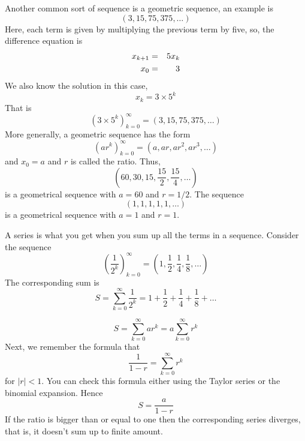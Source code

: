 \documentclass{scrreprt}
\theoremstyle{plain}
\theoremstyle{definition}
\theoremstyle{remark}
\begin{document}
Another common sort of sequence is a geometric sequence, an example is 
\begin{equation}
(3,15,75,375,\ldots)
\end{equation}
Here, each term is given by multiplying the previous term by five, so,
the difference equation is
\begin{eqnarray}
x_{k+1}&=&5x_k\cr
x_0&=&3
\end{eqnarray}
We also know the solution in this case,
\begin{equation}
x_k=3\times 5^k
\end{equation}
That is 
\begin{equation}
(3\times 5^k)_{k=0}^\infty=(3,15,75,375,\ldots)
\end{equation}
More generally, a geometric sequence has the form
\begin{equation}
(ar^k)_{k=0}^\infty=(a,ar,ar^2,ar^3,\ldots)
\end{equation}
and $x_0=a$ and $r$ is called the ratio. Thus,
\begin{equation}
\left(60,30,15,\frac{15}{2},\frac{15}{4},\ldots\right)
\end{equation}
is a geometrical sequence with $a=60$ and $r=1/2$. The sequence
\begin{equation}
\left(1,1,1,1,1,\ldots\right)
\end{equation}
is a geometrical sequence with $a=1$ and $r=1$.

A series is what you get when you sum up all the terms in a
sequence. Consider the sequence 
\begin{equation}
\left(\frac{1}{2^k}\right)_{k=0}^\infty=\left(1,\frac{1}{2},\frac{1}{4},\frac{1}{8},\ldots\right)
\end{equation}
The corresponding sum is
\begin{equation}
S=\sum_{k=0}^\infty\frac{1}{2^k}=1+\frac{1}{2}+\frac{1}{4}+\frac{1}{8}+\ldots
\end{equation}

\begin{equation}
S=\sum_{k=0}^\infty ar^k=a\sum_{k=0}^\infty r^k
\end{equation}
Next, we remember the formula that
\begin{equation}
\frac{1}{1-r}=\sum_{k=0}^\infty r^k
\end{equation}
for $|r|<1$. You can check this formula either using the Taylor series or the binomial expansion. Hence
\begin{equation}
S=\frac{a}{1-r}
\end{equation}
If the ratio is bigger than or equal to one then the corresponding
series diverges, that is, it doesn't sum up to finite amount.
\end{document}
